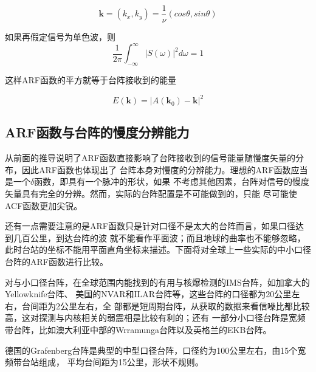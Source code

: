 \begin{equation}
\bm{k} = (k_x,k_y) = \frac{1}{\nu} (cos\theta, sin \theta)
\end{equation}

如果再假定信号为单色波，则
\begin{equation}
\frac{1}{2 \pi} \int_{-\infty}^{\infty} |S(\omega)|^2 d \omega = 1
\end{equation}

这样ARF函数的平方就等于台阵接收到的能量

\begin{equation}
E(\bm{k}) = |A(\bm{k}_0) - \bm{k}|^2
\end{equation}


\newpage
\subsection{ARF函数与台阵的慢度分辨能力}

从前面的推导说明了ARF函数直接影响了台阵接收到的信号能量随慢度矢量的分布，因此ARF函数也体现出了
台阵本身对慢度的分辨能力。理想的ARF函数应当是一个$\delta$函数，即具有一个脉冲的形状，如果
不考虑其他因素，台阵对信号的慢度矢量具有完全的分辨。然而，实际的台阵配置是不可能做到的，只能
尽可能使ACF函数更加尖锐。

还有一点需要注意的是ARF函数只是针对口径不是太大的台阵而言，如果口径达到几百公里，到达台阵的波
就不能看作平面波；而且地球的曲率也不能够忽略，此时台站的坐标不能用平面直角坐标来描述。下面将对全球上一些实际的中小口径台阵的ARF函数进行比较。

对与小口径台阵，在全球范围内能找到的有用与核爆检测的IMS台阵，如加拿大的Yellowknife台阵、
美国的NVAR和ILAR台阵等，这些台阵的口径都为20公里左右，台间距为2公里左右，全
部都是短周期台阵，从获取的数据来看信噪比都比较高，这对探测与内核相关的弱震相是比较有利的；还有
一部分小口径台阵是宽频带台阵，比如澳大利亚中部的Wrramunga台阵以及英格兰的EKB台阵。

德国的Grafenberg台阵是典型的中型口径台阵，口径约为100公里左右，由15个宽频带台站组成，
平均台间距为15公里，形状不规则。

